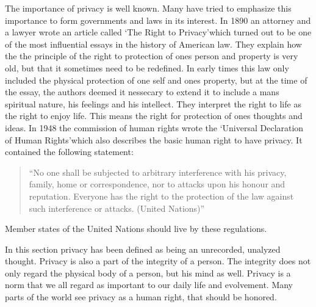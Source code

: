 The importance of privacy is well known. Many have tried to emphasize this importance to form governments and laws in its interest.
In 1890 an attorney and a lawyer wrote an article called  \lq The Right to Privacy\rq which turned out to be one of the most influential essays in the history of American law.\cite{website:the-right-to-privacy-info}
They explain how the the principle of the right to protection of ones person and property is very old, but that it sometimes need to be redefined. In early times this law only included the physical protection of one self and ones property, but at the time of the essay, the authors deemed it nessecary to extend it to include a mans spiritual nature, his feelings and his intellect. They interpret the right to life as the right to enjoy life. This means the right for protection of ones thoughts and ideas. In 1948 the commission of human rights wrote the \lq Universal Declaration of Human Rights\rq which also describes the basic human right to have privacy. It contained the following statement:

\blockquote{``No one shall be subjected to arbitrary interference with his privacy, family, home or correspondence, nor to attacks upon his honour and reputation. Everyone has the right to the protection of the law against such interference or attacks. (United Nations)''\cite{website:un-human-rights}}
Member states of the United Nations should live by these regulations.


In this section privacy has been defined as being an unrecorded, unalyzed thought. Privacy is also a part of the integrity of a person. The integrity does not only regard the physical body of a person, but his mind as well.
Privacy is a norm that we all regard as important to our daily life and evolvement. Many parts of the world see privacy as a human right, that should be honored.
